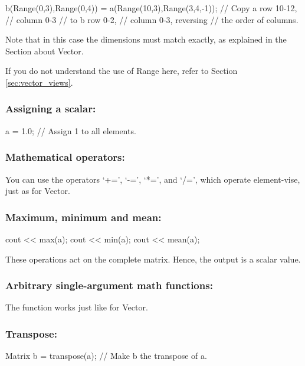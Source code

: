 \begin{code}
b(Range(0,3),Range(0,4)) =
   a(Range(10,3),Range(3,4,-1)); // Copy a row 10-12,
                                 // column 0-3
                                 // to b row 0-2,
                                 // column 0-3, reversing
                                 // the order of columns.
\end{code}
Note that in this case the dimensions must match exactly, as explained
in the Section about Vector.

If you do not understand the use of Range here, refer to Section
\ref{sec:vector_views}. 

\subsubsection{Assigning a scalar:}
\begin{code}
a = 1.0;                        // Assign 1 to all elements.
\end{code}

\subsubsection{Mathematical operators:}

You can use the operators `+=', `-=', `*=', and `/=', which operate
element-vise, just as for Vector.

\subsubsection{Maximum, minimum and mean:}
\begin{code}
cout << max(a);
cout << min(a);
cout << mean(a);
\end{code}
These operations act on the complete matrix. Hence, the output is a scalar
value.

\subsubsection{Arbitrary single-argument math functions:}

The function  works just like for Vector.

\subsubsection{Transpose:}
\begin{code}
Matrix b = transpose(a); // Make b the transpose of a.
\end{code}


